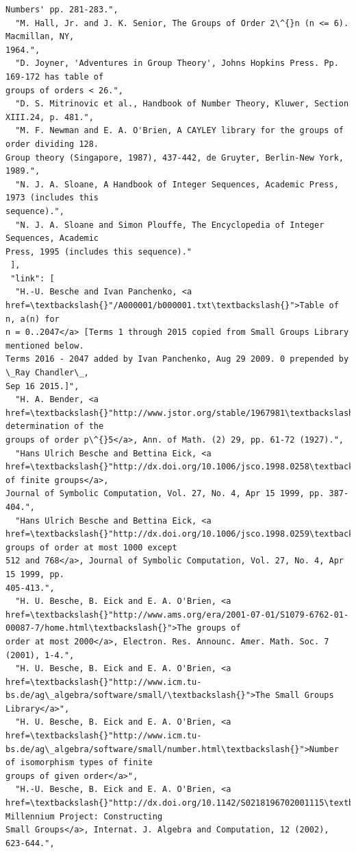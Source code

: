 \documentclass[11pt]{article}
\begin{document}
\begin{Verbatim}[commandchars=\\\{\}]
Numbers' pp. 281-283.",
  "M. Hall, Jr. and J. K. Senior, The Groups of Order 2\^{}n (n <= 6). Macmillan, NY,
1964.",
  "D. Joyner, 'Adventures in Group Theory', Johns Hopkins Press. Pp. 169-172 has table of
groups of orders < 26.",
  "D. S. Mitrinovic et al., Handbook of Number Theory, Kluwer, Section XIII.24, p. 481.",
  "M. F. Newman and E. A. O'Brien, A CAYLEY library for the groups of order dividing 128.
Group theory (Singapore, 1987), 437-442, de Gruyter, Berlin-New York, 1989.",
  "N. J. A. Sloane, A Handbook of Integer Sequences, Academic Press, 1973 (includes this
sequence).",
  "N. J. A. Sloane and Simon Plouffe, The Encyclopedia of Integer Sequences, Academic
Press, 1995 (includes this sequence)."
 ],
 "link": [
  "H.-U. Besche and Ivan Panchenko, <a href=\textbackslash{}"/A000001/b000001.txt\textbackslash{}">Table of n, a(n) for
n = 0..2047</a> [Terms 1 through 2015 copied from Small Groups Library mentioned below.
Terms 2016 - 2047 added by Ivan Panchenko, Aug 29 2009. 0 prepended by \_Ray Chandler\_,
Sep 16 2015.]",
  "H. A. Bender, <a href=\textbackslash{}"http://www.jstor.org/stable/1967981\textbackslash{}">A determination of the
groups of order p\^{}5</a>, Ann. of Math. (2) 29, pp. 61-72 (1927).",
  "Hans Ulrich Besche and Bettina Eick, <a
href=\textbackslash{}"http://dx.doi.org/10.1006/jsco.1998.0258\textbackslash{}">Construction of finite groups</a>,
Journal of Symbolic Computation, Vol. 27, No. 4, Apr 15 1999, pp. 387-404.",
  "Hans Ulrich Besche and Bettina Eick, <a
href=\textbackslash{}"http://dx.doi.org/10.1006/jsco.1998.0259\textbackslash{}">The groups of order at most 1000 except
512 and 768</a>, Journal of Symbolic Computation, Vol. 27, No. 4, Apr 15 1999, pp.
405-413.",
  "H. U. Besche, B. Eick and E. A. O'Brien, <a
href=\textbackslash{}"http://www.ams.org/era/2001-07-01/S1079-6762-01-00087-7/home.html\textbackslash{}">The groups of
order at most 2000</a>, Electron. Res. Announc. Amer. Math. Soc. 7 (2001), 1-4.",
  "H. U. Besche, B. Eick and E. A. O'Brien, <a href=\textbackslash{}"http://www.icm.tu-
bs.de/ag\_algebra/software/small/\textbackslash{}">The Small Groups Library</a>",
  "H. U. Besche, B. Eick and E. A. O'Brien, <a href=\textbackslash{}"http://www.icm.tu-
bs.de/ag\_algebra/software/small/number.html\textbackslash{}">Number of isomorphism types of finite
groups of given order</a>",
  "H.-U. Besche, B. Eick and E. A. O'Brien, <a
href=\textbackslash{}"http://dx.doi.org/10.1142/S0218196702001115\textbackslash{}">A Millennium Project: Constructing
Small Groups</a>, Internat. J. Algebra and Computation, 12 (2002), 623-644.",

\end{Verbatim}
\end{document}
